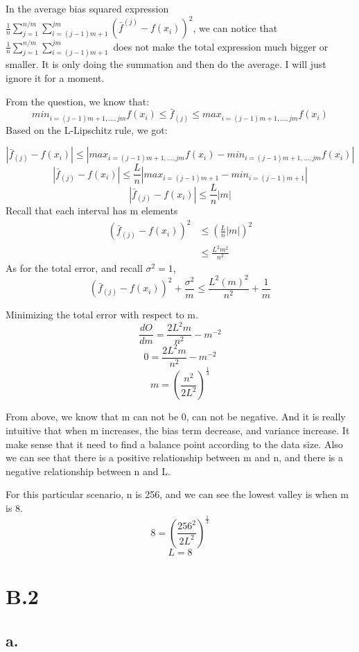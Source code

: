 \documentclass{article}
\begin{document}
In the average bias squared expression $\frac{1}{n} \sum_{j=1}^{n/m} \sum_{i=(j-1)m+1}^{jm} (\bar{f}^{(j)} - f(x_i))^2$, we can notice that $\frac{1}{n} \sum_{j=1}^{n/m} \sum_{i=(j-1)m+1}^{jm}$ does not make the total expression much bigger or smaller. It is only doing the summation and then do the average. I will just ignore it for a moment. 

From the question, we know that:
\[ min_{i=(j-1)m+1, \dots ,jm} f(x_i) \le \bar{f}_{(j)} \le max_{i=(j-1)m+1, \dots ,jm} f(x_i) \]
Based on the L-Lipschitz rule, we got:

\[|\bar{f}_{(j)} - f(x_i)|  \le  | max_{i=(j-1)m+1, \dots ,jm} f(x_i) - min_{i=(j-1)m+1, \dots ,jm} f(x_i) |\]
\[ |\bar{f}_{(j)} - f(x_i)|  \le \frac{L}{n}|  max_{i=(j-1)m+1} - min_{i=(j-1)m+1} |\]
\[ |\bar{f}_{(j)} - f(x_i)|  \le  \frac{L}{n} |m| \]
Recall that each interval has m elements
\begin{subequations}
\begin{align*}
(\bar{f}_{(j)} - f(x_i))^2 & \le (\frac{L}{n} |m|)^2 \\
& \le \frac{L^2m^2}{n^2}
\end{align*}
\end{subequations}
As for the total error, and recall $\sigma^2 = 1$, \newline
\[ (\bar{f}_{(j)} - f(x_i))^2 + \frac{\sigma^2}{m} \le \frac{L^2(m)^2}{n^2} + \frac{1}{m} \]

Minimizing the total error with respect to m.
\[\frac{dO}{dm} = \frac{2L^2m}{n^2} - m^{-2}\]
\[0 = \frac{2L^2m}{n^2} - m^{-2}\]
\[m = (\frac{n^2}{2L^2})^{\frac{1}{3}}\]

From above, we know that m can not be 0, can not be negative. And it is really intuitive that when m increases, the bias term decrease, and variance increase. It make sense that it need to find a balance point according to the data size. Also we can see that there is a positive relationship between m and n, and there is a negative relationship between n and L.


For this particular scenario, n is 256, and we can see the lowest valley is when m is 8.
\[8 = (\frac{256^2}{2L^2})^{\frac{1}{3}}\]
\[L = 8\]






\section*{B.2}
\subsection*{a.}
\end{document}
